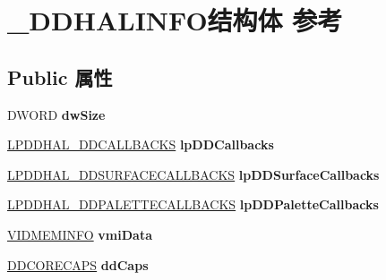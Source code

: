 \hypertarget{struct___d_d_h_a_l_i_n_f_o}{}\section{\+\_\+\+D\+D\+H\+A\+L\+I\+N\+F\+O结构体 参考}
\label{struct___d_d_h_a_l_i_n_f_o}
\subsection*{Public 属性}
\begin{DoxyCompactItemize}
\item 
\mbox{\label{struct___d_d_h_a_l_i_n_f_o_a9f41af23111762e2af2f5643ed044089}} 
D\+W\+O\+RD {\bfseries dw\+Size}
\item 
\mbox{\label{struct___d_d_h_a_l_i_n_f_o_aad754b3abbf3faa151d6d15a9ae361d1}} 
\hyperlink{struct___d_d_h_a_l___d_d_c_a_l_l_b_a_c_k_s}{L\+P\+D\+D\+H\+A\+L\+\_\+\+D\+D\+C\+A\+L\+L\+B\+A\+C\+KS} {\bfseries lp\+D\+D\+Callbacks}
\item 
\mbox{\label{struct___d_d_h_a_l_i_n_f_o_ac594ade60dd48f8e73f7bda33215ab53}} 
\hyperlink{struct___d_d_h_a_l___d_d_s_u_r_f_a_c_e_c_a_l_l_b_a_c_k_s}{L\+P\+D\+D\+H\+A\+L\+\_\+\+D\+D\+S\+U\+R\+F\+A\+C\+E\+C\+A\+L\+L\+B\+A\+C\+KS} {\bfseries lp\+D\+D\+Surface\+Callbacks}
\item 
\mbox{\label{struct___d_d_h_a_l_i_n_f_o_a666deedd010ac36618c9c37d7e450fb3}} 
\hyperlink{struct___d_d_h_a_l___d_d_p_a_l_e_t_t_e_c_a_l_l_b_a_c_k_s}{L\+P\+D\+D\+H\+A\+L\+\_\+\+D\+D\+P\+A\+L\+E\+T\+T\+E\+C\+A\+L\+L\+B\+A\+C\+KS} {\bfseries lp\+D\+D\+Palette\+Callbacks}
\item 
\mbox{\label{struct___d_d_h_a_l_i_n_f_o_a6c7880bc68f232eaf0983a6e367065a4}} 
\hyperlink{struct___v_i_d_m_e_m_i_n_f_o}{V\+I\+D\+M\+E\+M\+I\+N\+FO} {\bfseries vmi\+Data}
\item 
\mbox{\label{struct___d_d_h_a_l_i_n_f_o_ae7adddd200cfd13e5422ef011c1ca0a6}} 
\hyperlink{struct___d_d_c_o_r_e_c_a_p_s}{D\+D\+C\+O\+R\+E\+C\+A\+PS} {\bfseries dd\+Caps}
\item 
\mbox{\label{struct___d_d_h_a_l_i_n_f_o_ad623482b74582e2e4b48eecfff30faf8}} 

\end{DoxyCompactItemize}
